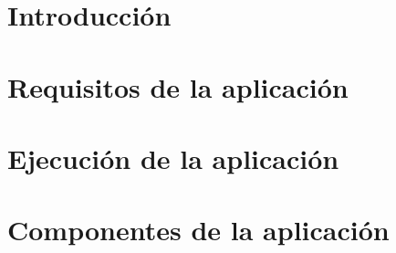 



	\begin{titlepage}
		
	\end{titlepage}
	
	\tableofcontents
	\newpage
	
    \section{Introducción}
        
        \newpage
        
        
    \section{Requisitos de la aplicación}
        
        \newpage
        
    \section{Ejecución de la aplicación}
        
        \newpage
        
    \section{Componentes de la aplicación}
        
		\newpage


